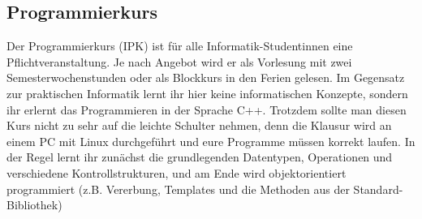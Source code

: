 \subsection{Programmierkurs}
\label{ipk}
Der Programmierkurs (\gls{IPK}) ist für alle Informatik-Studentinnen eine Pflichtveranstaltung. Je nach Angebot wird er als Vorlesung mit zwei Semesterwochenstunden oder als Blockkurs in den Ferien gelesen. Im Gegensatz zur praktischen Informatik lernt ihr hier keine informatischen Konzepte, sondern ihr erlernt das Programmieren in der Sprache C++. Trotzdem sollte man diesen Kurs nicht zu sehr auf die leichte Schulter nehmen, denn die Klausur wird an einem PC mit Linux durchgeführt und eure Programme müssen korrekt laufen. In der Regel lernt ihr zunächst die grundlegenden Datentypen, Operationen und verschiedene Kontrollstrukturen, und am Ende wird objektorientiert programmiert (z.B. Vererbung, Templates und die Methoden aus der Standard-Bibliothek)
